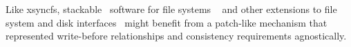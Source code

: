 %
%
%
%
Like xsyncfs, stackable \module\ software for file systems%
~\cite{rosenthal90evolving, heidemann91layered, skinner93stacking,
heidemann94filesystem,zadok99extending,
zadok00fist,wright03ncryptfs,wright06versatility} and other extensions
to file system and disk interfaces~\cite{huang05fs2,sivathanu06typesafe}
might
benefit from a patch-like mechanism that represented write-before
relationships and consistency requirements agnostically.

\begin{comment}
Previous
systems like FiST~\cite{zadok00fist} or GEOM~\cite{geom} generally focus on
an individual portion of the system and thus restrict both what a \module\
can do and how \modules\ can be arranged. FiST, for instance, does not
provide a way to deal with structures on the disk directly -- it provides
only ``wrapper'' functionality around existing file
systems. %
GEOM, on the other hand, deals only with the block device layer, and has no
way to work with the file systems stored on those block devices. Neither
has a formal way of specifying or honoring complex write-ordering
information, which is what \patches\ in \Kudos\ provide. We imagine that
systems like these could be adapted to work with \patches, giving the
benefits of both ideas.

\paragraph{Applications}

A variety of extensions to file systems and disk interfaces have been proposed
in recent work, like the FS2 Free Space File System~\cite{huang05fs2},
encrypting file systems like NCryptfs~\cite{wright03ncryptfs}, and type-safe
disks~\cite{sivathanu06typesafe}. The \Kudos\
\module\ system may provide an interesting platform for implementations 
of these ideas.
\end{comment}


